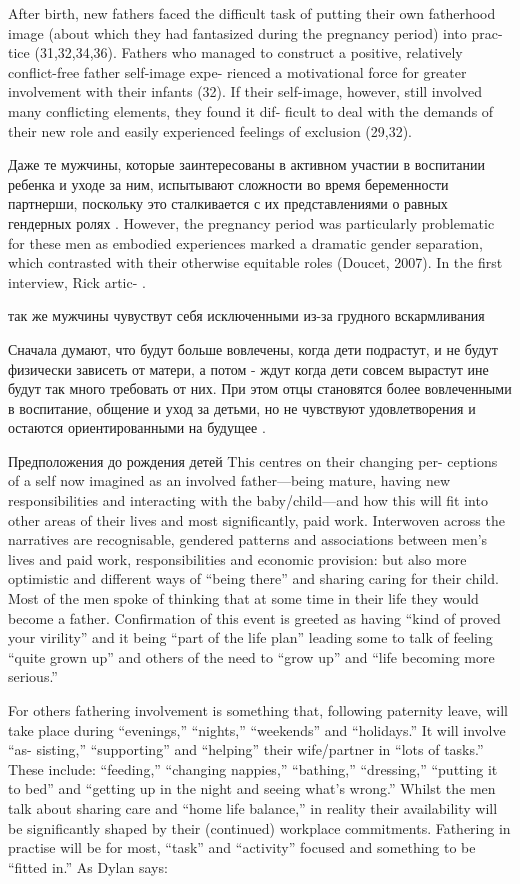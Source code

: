 \documentclass{../../common/thesisbyxetex}
\begin{document}
After birth, new fathers faced the difficult task of
putting their own fatherhood image (about which they
had fantasized during the pregnancy period) into prac-
tice (31,32,34,36). Fathers who managed to construct a
positive, relatively conflict-free father self-image expe-
rienced a motivational force for greater involvement
with their infants (32). If their self-image, however, still
involved many conflicting elements, they found it dif-
ficult to deal with the demands of their new role and
easily experienced feelings of exclusion (29,32).\cite[314]{flit}

Даже те мужчины, которые заинтересованы в активном участии в воспитании ребенка и уходе за ним,
испытывают сложности во время беременности партнерши, поскольку это сталкивается с их
представлениями о равных гендерных ролях . However, the pregnancy period was
particularly problematic for these
men as embodied experiences marked a dramatic gender separation, which contrasted
with their otherwise equitable roles (Doucet, 2007). In the first interview, Rick artic-
\cite[20]{long}.

так же мужчины чувуствут себя исключенными из-за грудного вскармливания \cite[21]{long}

Сначала думают, что будут больше вовлечены, когда дети подрастут, и не будут физически зависеть от
матери, а потом - ждут когда дети совсем вырастут ине будут так много требовать от них. При этом
отцы становятся более вовлеченными в воспитание, общение и уход за детьми, но не чувствуют
удовлетворения и остаются ориентированными на будущее \cite[22]{long}.


Предположения до рождения детей
This centres on their changing per-
ceptions of a self now imagined as an involved father—being mature, having new
responsibilities and interacting with the baby/child—and how this will fit into other
areas of their lives and most significantly, paid work. Interwoven across the narratives
are recognisable, gendered patterns and associations between men’s lives and paid
work, responsibilities and economic provision: but also more optimistic and different
ways of “being there” and sharing caring for their child. Most of the men spoke of
thinking that at some time in their life they would become a father. Confirmation of this
event is greeted as having “kind of proved your virility” and it being “part of the life
plan” leading some to talk of feeling “quite grown up” and others of the need to “grow
up” and “life becoming more serious.”\cite[367]{tri}

For others fathering involvement is something that, following paternity leave, will
take place during “evenings,” “nights,” “weekends” and “holidays.” It will involve “as-
sisting,” “supporting” and “helping” their wife/partner in “lots of tasks.” These include:
“feeding,” “changing nappies,” “bathing,” “dressing,” “putting it to bed” and “getting
up in the night and seeing what’s wrong.” Whilst the men talk about sharing care and
“home life balance,” in reality their availability will be significantly shaped by their
(continued) workplace commitments. Fathering in practise will be for most, “task” and
“activity” focused and something to be “fitted in.” \cite[369]{tri}As Dylan says:
\end{document}
